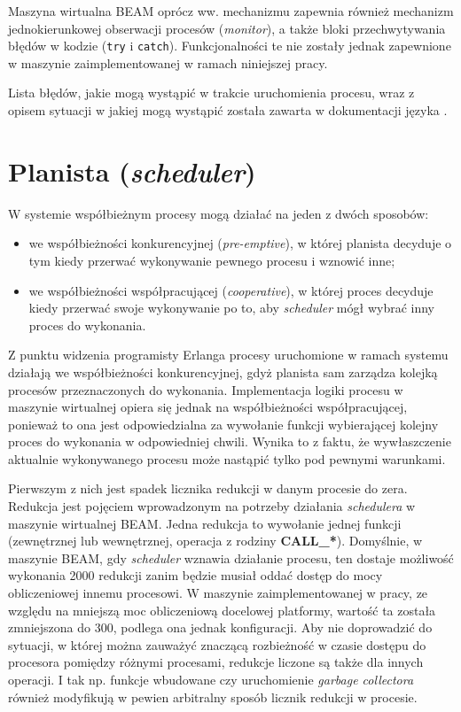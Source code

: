 Maszyna wirtualna BEAM oprócz ww. mechanizmu zapewnia również mechanizm jednokierunkowej obserwacji procesów (\emph{monitor}), a także bloki przechwytywania błędów w kodzie (\texttt{try} i \texttt{catch}).
Funkcjonalności te nie zostały jednak zapewnione w maszynie zaimplementowanej w ramach niniejszej pracy.

Lista błędów, jakie mogą wystąpić w trakcie uruchomienia procesu, wraz z opisem sytuacji w jakiej mogą wystąpić została zawarta w dokumentacji języka \cite{ErlangErrors}.

\section{Planista (\emph{scheduler})}
\label{sec:maszynaScheduler}

W systemie współbieżnym procesy mogą działać na jeden z dwóch sposobów:
\begin{itemize}
\item we współbieżności konkurencyjnej (\emph{pre-emptive}), w której planista decyduje o tym kiedy przerwać wykonywanie pewnego procesu i wznowić inne;
\item we współbieżności współpracującej (\emph{cooperative}), w której proces decyduje kiedy przerwać swoje wykonywanie po to, aby \emph{scheduler} mógł wybrać inny proces do wykonania.
\end{itemize}

Z punktu widzenia programisty Erlanga procesy uruchomione w ramach systemu działają we współbieżności konkurencyjnej, gdyż planista sam zarządza kolejką procesów przeznaczonych do wykonania.
Implementacja logiki procesu w maszynie wirtualnej opiera się jednak na współbieżności współpracującej, ponieważ to ona jest odpowiedzialna za wywołanie funkcji wybierającej kolejny proces do wykonania w odpowiedniej chwili. Wynika to z faktu, że wywłaszczenie aktualnie wykonywanego procesu może nastąpić tylko pod pewnymi warunkami.

Pierwszym z nich jest spadek licznika redukcji w danym procesie do zera.
Redukcja jest pojęciem wprowadzonym na potrzeby działania \emph{schedulera} w maszynie wirtualnej BEAM.
Jedna redukcja to wywołanie jednej funkcji (zewnętrznej lub wewnętrznej, operacja z rodziny \textbf{CALL\_*}).
Domyślnie, w maszynie BEAM, gdy \emph{scheduler} wznawia działanie procesu, ten dostaje możliwość wykonania 2000 redukcji zanim będzie musiał oddać dostęp do mocy obliczeniowej innemu procesowi.
W maszynie zaimplementowanej w pracy, ze względu na mniejszą moc obliczeniową docelowej platformy, wartość ta została zmniejszona do 300, podlega ona jednak konfiguracji.
Aby nie doprowadzić do sytuacji, w której można zauważyć znaczącą rozbieżność w czasie dostępu do procesora pomiędzy różnymi procesami, redukcje liczone są także dla innych operacji.
I tak np. funkcje wbudowane czy uruchomienie \emph{garbage collectora} również modyfikują w pewien arbitralny sposób licznik redukcji w procesie. 

